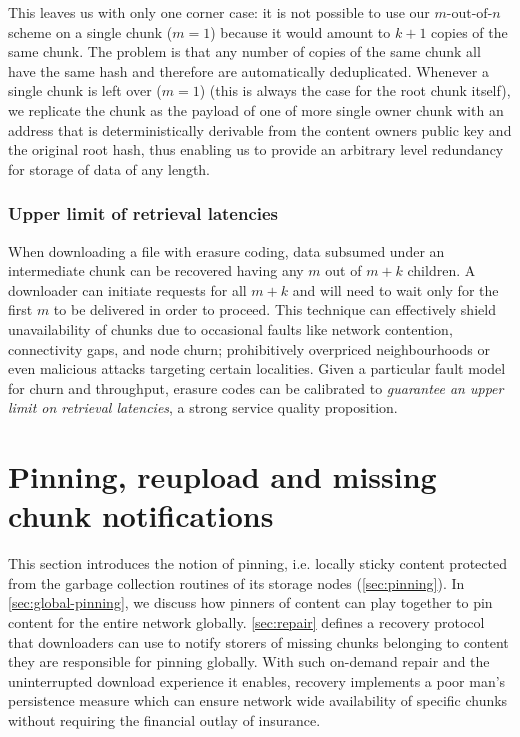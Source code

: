 This leaves us with only one corner case: it is not possible to use our $m\text{-out-of-}n$ scheme on a single chunk ($m=1$) because it would amount to $k+1$ copies of the same chunk. The problem is that any number of copies of the same chunk all have the same hash and therefore are automatically deduplicated. Whenever a single chunk is left over ($m=1$) (this is always the case for the root chunk itself), we replicate the chunk as the payload of one of more single owner chunk with an address that is deterministically derivable from the content owners public key and the original root hash, thus enabling us to provide an arbitrary level redundancy for storage of data of any length.

\subsubsection{Upper limit of retrieval latencies}

When downloading a file with erasure coding, data subsumed under an intermediate chunk can be recovered having any $m$ out of $m+k$ children. A downloader can initiate requests for all $m+k$ and will need to wait only for the first $m$ to be delivered in order to proceed.
This technique can effectively shield unavailability of chunks due to occasional faults like network contention, connectivity gaps, and node churn; prohibitively overpriced neighbourhoods or even malicious attacks targeting certain localities. Given a particular fault model for churn and throughput, erasure codes can be calibrated to
\emph{guarantee an upper limit on retrieval latencies}, a strong service quality proposition.





\section{Pinning, reupload and missing chunk notifications \statusyellow}\label{sec:reupload}

This section introduces the notion of pinning, i.e. locally sticky content protected from the garbage collection routines of its storage nodes (\ref{sec:pinning}). In \ref{sec:global-pinning}, we discuss how pinners of content can play together to pin content for the entire network globally. \ref{sec:repair} defines a recovery protocol that downloaders can use to notify storers of missing chunks belonging to content they are responsible for pinning globally. With such on-demand repair and the uninterrupted download experience it enables, recovery implements a poor man's persistence measure which can ensure network wide availability of specific chunks without requiring the financial outlay of insurance.

